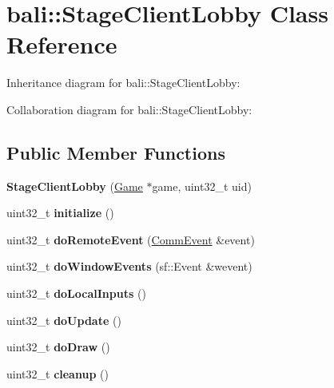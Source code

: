 \hypertarget{classbali_1_1_stage_client_lobby}{\section{bali\-:\-:Stage\-Client\-Lobby Class Reference}
\label{classbali_1_1_stage_client_lobby}
}


Inheritance diagram for bali\-:\-:Stage\-Client\-Lobby\-:


Collaboration diagram for bali\-:\-:Stage\-Client\-Lobby\-:
\subsection*{Public Member Functions}
\begin{DoxyCompactItemize}
\item 
\hypertarget{classbali_1_1_stage_client_lobby_a0961ec294c3c6c907cd92ba46dd5348b}{{\bfseries Stage\-Client\-Lobby} (\hyperlink{classbali_1_1_game}{Game} $\ast$game, uint32\-\_\-t uid)}\label{classbali_1_1_stage_client_lobby_a0961ec294c3c6c907cd92ba46dd5348b}

\item 
\hypertarget{classbali_1_1_stage_client_lobby_afcdfad9e6f66611747af9fb7cce8179a}{uint32\-\_\-t {\bfseries initialize} ()}\label{classbali_1_1_stage_client_lobby_afcdfad9e6f66611747af9fb7cce8179a}

\item 
\hypertarget{classbali_1_1_stage_client_lobby_ad0a0e167698eafed068852206ba17868}{uint32\-\_\-t {\bfseries do\-Remote\-Event} (\hyperlink{classbali_1_1_comm_event}{Comm\-Event} \&event)}\label{classbali_1_1_stage_client_lobby_ad0a0e167698eafed068852206ba17868}

\item 
\hypertarget{classbali_1_1_stage_client_lobby_add5d28c871f87a713350c5c1f18c470e}{uint32\-\_\-t {\bfseries do\-Window\-Events} (sf\-::\-Event \&wevent)}\label{classbali_1_1_stage_client_lobby_add5d28c871f87a713350c5c1f18c470e}

\item 
\hypertarget{classbali_1_1_stage_client_lobby_adf09b0e9c4d3743fd7fbd6914d335776}{uint32\-\_\-t {\bfseries do\-Local\-Inputs} ()}\label{classbali_1_1_stage_client_lobby_adf09b0e9c4d3743fd7fbd6914d335776}

\item 
\hypertarget{classbali_1_1_stage_client_lobby_a618af316fbc5ce1a389dcf6738ccd898}{uint32\-\_\-t {\bfseries do\-Update} ()}\label{classbali_1_1_stage_client_lobby_a618af316fbc5ce1a389dcf6738ccd898}

\item 
\hypertarget{classbali_1_1_stage_client_lobby_abaccfcf8da89cef368fc21238f2ee599}{uint32\-\_\-t {\bfseries do\-Draw} ()}\label{classbali_1_1_stage_client_lobby_abaccfcf8da89cef368fc21238f2ee599}

\item 
\hypertarget{classbali_1_1_stage_client_lobby_a71832c3117934ad13f0502592e989fab}{uint32\-\_\-t {\bfseries cleanup} ()}\label{classbali_1_1_stage_client_lobby_a71832c3117934ad13f0502592e989fab}

\end{DoxyCompactItemize}
